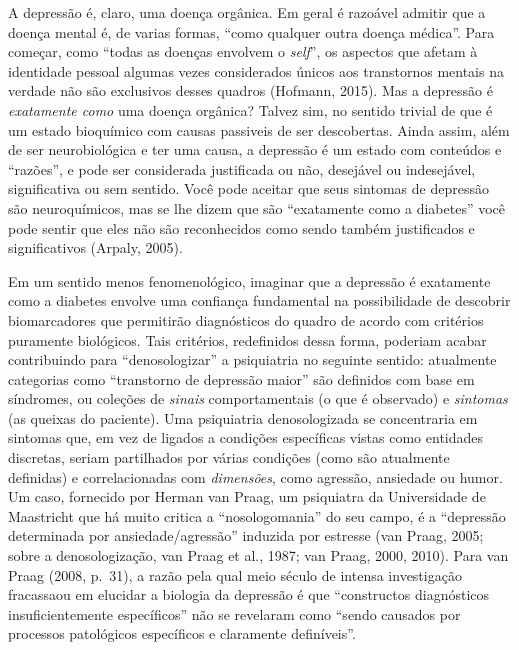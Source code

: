 A depressão é, claro, uma doença orgânica. Em geral é razoável admitir
que a doença mental é, de varias formas, ``como qualquer outra doença
médica''. Para começar, como ``todas as doenças envolvem o \emph{self}'', os
aspectos que afetam à identidade pessoal algumas vezes considerados
únicos aos transtornos mentais na verdade não são exclusivos desses
quadros (Hofmann, 2015). Mas a depressão é \emph{exatamente como} uma
doença orgânica? Talvez sim, no sentido trivial de que é um estado
bioquímico com causas passiveis de ser descobertas. Ainda assim, além de
ser neurobiológica e ter uma causa, a depressão é um estado com
conteúdos e ``razões'', e pode ser considerada justificada ou não,
desejável ou indesejável, significativa ou sem sentido. Você pode
aceitar que seus sintomas de depressão são neuroquímicos, mas se lhe
dizem que são ``exatamente como a diabetes'' você pode sentir que eles
não são reconhecidos como sendo também justificados e significativos
(Arpaly, 2005).

Em um sentido menos fenomenológico, imaginar que a depressão é
exatamente como a diabetes envolve uma confiança fundamental na
possibilidade de descobrir biomarcadores que permitirão diagnósticos do
quadro de acordo com critérios puramente biológicos. Tais critérios,
redefinidos dessa forma, poderiam acabar contribuindo para
``denosologizar'' a psiquiatria no seguinte sentido: atualmente
categorias como ``transtorno de depressão maior'' são definidos com base
em síndromes, ou coleções de \emph{sinais} comportamentais (o que é
observado) e \emph{sintomas} (as queixas do paciente). Uma psiquiatria
denosologizada se concentraria em sintomas que, em vez de ligados a
condições específicas vistas como entidades discretas, seriam
partilhados por várias condições (como são atualmente definidas) e
correlacionadas com \emph{dimensões}, como agressão, ansiedade ou humor.
Um caso, fornecido por Herman van Praag, um psiquiatra da Universidade
de Maastricht que há muito critica a ``nosologomania'' do seu campo, é a
``depressão determinada por ansiedade/agressão'' induzida por estresse
(van Praag, 2005; sobre a denosologização, van Praag et al., 1987; van
Praag, 2000, 2010). Para van Praag (2008, p.~31), a razão pela qual meio
século de intensa investigação fracassaou em elucidar a biologia da
depressão é que ``constructos diagnósticos insuficientemente
específicos'' não se revelaram como ``sendo causados por processos
patológicos específicos e claramente definíveis''.

